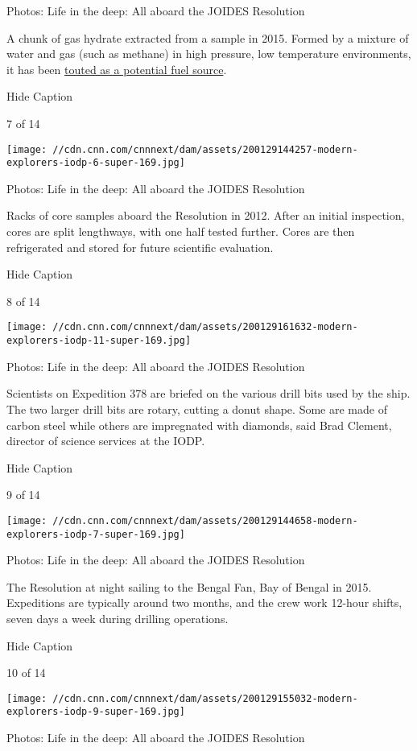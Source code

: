 Photos: Life in the deep: All aboard the JOIDES Resolution

A chunk of gas hydrate extracted from a sample in 2015. Formed by a
mixture of water and gas (such as methane) in high pressure, low
temperature environments, it has been
\href{https://cnn.com/2017/10/31/asia/on-japan-flammable-ice/index.html}{touted
as a potential fuel source}.

Hide Caption

7 of 14

\texttt{[image: //cdn.cnn.com/cnnnext/dam/assets/200129144257-modern-explorers-iodp-6-super-169.jpg]}

Photos: Life in the deep: All aboard the JOIDES Resolution

Racks of core samples aboard the Resolution in 2012. After an initial
inspection, cores are split lengthways, with one half tested further.
Cores are then refrigerated and stored for future scientific evaluation.

Hide Caption

8 of 14

\texttt{[image: //cdn.cnn.com/cnnnext/dam/assets/200129161632-modern-explorers-iodp-11-super-169.jpg]}

Photos: Life in the deep: All aboard the JOIDES Resolution

Scientists on Expedition 378 are briefed on the various drill bits used
by the ship. The two larger drill bits are rotary, cutting a donut
shape. Some are made of carbon steel while others are impregnated with
diamonds, said Brad Clement, director of science services at the IODP.

Hide Caption

9 of 14

\texttt{[image: //cdn.cnn.com/cnnnext/dam/assets/200129144658-modern-explorers-iodp-7-super-169.jpg]}

Photos: Life in the deep: All aboard the JOIDES Resolution

The Resolution at night sailing to the Bengal Fan, Bay of Bengal in
2015. Expeditions are typically around two months, and the crew work
12-hour shifts, seven days a week during drilling operations.

Hide Caption

10 of 14

\texttt{[image: //cdn.cnn.com/cnnnext/dam/assets/200129155032-modern-explorers-iodp-9-super-169.jpg]}

Photos: Life in the deep: All aboard the JOIDES Resolution

